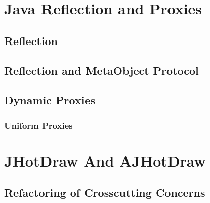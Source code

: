 \section{Java Reflection and Proxies}\label{Java Reflection and Proxies}

\subsection{Reflection}\label{Reflection}

\subsection{Reflection and Meta­Object Protocol}\label{Reflection and Meta­Object Protocol}

\subsection{Dynamic Proxies}\label{Dynamic Proxies}

\subsubsection{Uniform Proxies}\label{Uniform Proxies}

\section{JHotDraw And AJHotDraw}\label{JHotDraw And AJHotDraw}

\subsection{Refactoring of Crosscutting Concerns}

